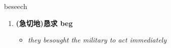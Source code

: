 
\begin{frame}
{\huge beseech}
\begin{center}
\begin{enumerate}\Large
  \item \textbf{(急切地)恳求 beg}
  \begin{itemize}
    \item \em{\Large{they besought the military to act immediately}}
  \end{itemize}
\end{enumerate}
\end{center}
\end{frame}
